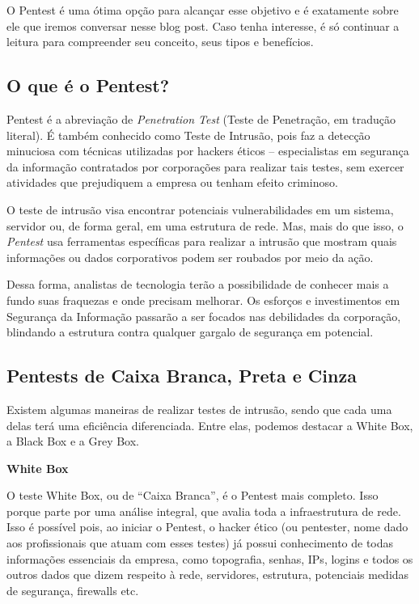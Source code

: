 O Pentest é uma ótima opção para alcançar esse objetivo e é exatamente sobre ele que iremos conversar nesse blog post. Caso tenha interesse, é só continuar a leitura para compreender seu conceito, seus tipos e benefícios.

\subsection{O que é o Pentest?}

Pentest é a abreviação de \textit{Penetration Test} (Teste de Penetração, em tradução literal). É também conhecido como Teste de Intrusão, pois faz a detecção minuciosa com técnicas utilizadas por hackers éticos – especialistas em segurança da informação contratados por corporações para realizar tais testes, sem exercer atividades que prejudiquem a empresa ou tenham efeito criminoso.

O teste de intrusão visa encontrar potenciais vulnerabilidades em um sistema, servidor ou, de forma geral, em uma estrutura de rede. Mas, mais do que isso, o \textit{Pentest} usa ferramentas específicas para realizar a intrusão que mostram quais informações ou dados corporativos podem ser roubados por meio da ação.

Dessa forma, analistas de tecnologia terão a possibilidade de conhecer mais a fundo suas fraquezas e onde precisam melhorar. Os esforços e investimentos em Segurança da Informação passarão a ser focados nas debilidades da corporação, blindando a estrutura contra qualquer gargalo de segurança em potencial.

\subsection{Pentests de Caixa Branca, Preta e Cinza}

Existem algumas maneiras de realizar testes de intrusão, sendo que cada uma delas terá uma eficiência diferenciada. Entre elas, podemos destacar a White Box, a Black Box e a Grey Box.

\textbf{White Box}

O teste White Box, ou de “Caixa Branca”, é o Pentest mais completo. Isso porque parte por uma análise integral, que avalia toda a infraestrutura de rede. Isso é possível pois, ao iniciar o Pentest, o hacker ético (ou pentester, nome dado aos profissionais que atuam com esses testes) já possui conhecimento de todas informações essenciais da empresa, como topografia, senhas, IPs, logins e todos os outros dados que dizem respeito à rede, servidores, estrutura, potenciais medidas de segurança, firewalls etc.

